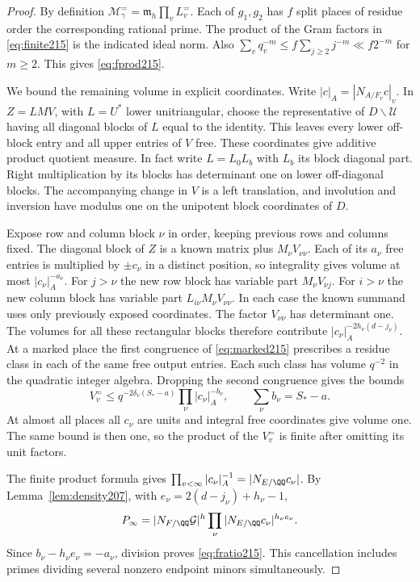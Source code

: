 \documentclass[a4paper,11pt]{article}
\theoremstyle{definition}
\theoremstyle{remark}
\numberwithin{equation}{section}
\begin{document}
\begin{proof}
By definition \(\mathcal M_\gamma^{=}=\mathfrak m_h\prod_v L_v^{=}\).
Each of \(g_1,g_2\) has \(f\) split places of residue order the
corresponding rational prime. The product of the Gram factors in
\eqref{eq:finite215} is the indicated ideal norm. Also
\(\sum_v q_v^{-m}\le f\sum_{j\ge2}j^{-m}\ll f2^{-m}\)
for \(m\ge2\). This gives \eqref{eq:fprod215}.

We bound the remaining volume in explicit coordinates. Write
\(|c|_A=|N_{A/F_v}c|_v\). In \(Z=LMV\), with \(L=U^*\)
lower unitriangular, choose the representative of
\(D\backslash\mathcal U\) having all diagonal blocks of \(L\)
equal to the identity. This leaves every lower off-block entry
and all upper entries of \(V\) free. These coordinates give
additive product quotient measure. In fact write \(L=L_0 L_b\)
with \(L_b\) its block diagonal part. Right multiplication
by its blocks has determinant one on lower off-diagonal blocks.
The accompanying change in \(V\) is a left translation, and
involution and inversion have modulus one on the unipotent
block coordinates of \(D\).

Expose row and column block \(\nu\) in order, keeping previous
rows and columns fixed. The diagonal block of \(Z\) is a
known matrix plus \(M_\nu V_{\nu\nu}\). Each of its \(a_\nu\)
free entries is multiplied by \(\pm c_\nu\) in a distinct
position, so integrality gives volume at most
\(|c_\nu|_A^{-a_\nu}\). For \(j>\nu\) the new row block has
variable part \(M_\nu V_{\nu j}\). For \(i>\nu\) the new
column block has variable part \(L_{i\nu}M_\nu V_{\nu\nu}\).
In each case the known summand uses only previously exposed
coordinates. The factor \(V_{\nu\nu}\) has determinant one.
The volumes for all these rectangular blocks therefore
contribute \(|c_\nu|_A^{-2h_\nu(d-j_\nu)}\).
At a marked place the first congruence of \eqref{eq:marked215}
prescribes a residue class in each of the same free output
entries. Each such class has volume \(q^{-2}\) in the quadratic
integer algebra. Dropping the second congruence gives the bounds
\[
       V_v^{=}\le q^{-2\delta_v(S_*-a)}
                         \prod_\nu |c_\nu|_A^{-b_\nu},
       \qquad \sum_\nu b_\nu=S_*-a .
\]
At almost all places all \(c_\nu\) are units and integral free
coordinates give volume one. The same bound is then one, so
the product of the \(V_v^{=}\) is finite after omitting its
unit factors.

The finite product formula gives
\(\prod_{v<\infty}|c_\nu|_A^{-1}=|N_{E/\QQ}c_\nu|\).
By Lemma~\ref{lem:density207}, with
\(e_\nu=2(d-j_\nu)+h_\nu-1\),
\[
 P_\infty=|N_{F/\QQ}\mathcal G|^h
                       \prod_\nu |N_{E/\QQ}c_\nu|^{h_\nu e_\nu}.
\]
Since \(b_\nu-h_\nu e_\nu=-a_\nu\), division proves
\eqref{eq:fratio215}. This cancellation includes primes dividing
several nonzero endpoint minors simultaneously.
\end{proof}
\end{document}
